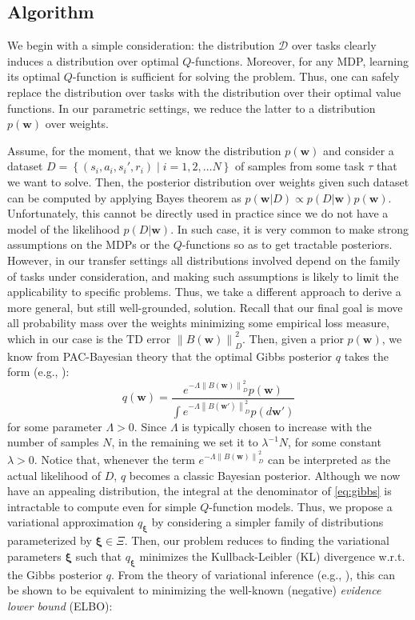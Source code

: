 \documentclass{article}
\newcommand{\norm}[1]{\left\lVert #1 \right\rVert}
\begin{document}
\subsection{Algorithm}\label{sec:alg}

We begin with a simple consideration: the distribution $\mathcal{D}$ over tasks clearly induces a distribution over optimal $Q$-functions.  Moreover, for any MDP, learning its optimal $Q$-function is sufficient for solving the problem. Thus, one can safely replace the distribution over tasks with the distribution over their optimal value functions. In our parametric settings, we reduce the latter to a distribution $p(\bm{w})$ over weights.
 
Assume, for the moment, that we know the distribution $p(\bm{w})$ and consider a dataset $D=\left\{(s_i,a_i,s_i',r_i) \mid i = 1,2,\dots N\right\}$ of samples from some task $\tau$ that we want to solve. Then, the posterior distribution over weights given such dataset can be computed by applying Bayes theorem as $p(\bm{w} | D) \propto p(D | \bm{w})p(\bm{w})$. Unfortunately, this cannot be directly used in practice since we do not have a model of the likelihood $p(D|\bm{w})$. In such case, it is very common to make strong assumptions on the MDPs or the $Q$-functions so as to get tractable posteriors. However, in our transfer settings all distributions involved depend on the family of tasks under consideration, and making such assumptions is likely to limit the applicability to specific problems. Thus, we take a different approach to derive a more general, but still well-grounded, solution. Recall that our final goal is move all probability mass over the weights minimizing some empirical loss measure, which in our case is the TD error $\norm{B(\bm{w})}_D^2$. Then, given a prior $p(\bm{w})$, we know from PAC-Bayesian theory that the optimal Gibbs posterior $q$ takes the form (e.g., \cite{catoni2007pac}):
\begin{equation}\label{eq:gibbs}
q(\bm{w}) = \frac{e^{-\Lambda\norm{B(\bm{w})}_D^2}p(\bm{w})}{\int e^{-\Lambda\norm{B(\bm{w}')}_D^2}p(d\bm{w}')}
\end{equation}
for some parameter $\Lambda > 0$.  Since $\Lambda$ is typically chosen to increase with the number of samples $N$, in the remaining we set it to $\lambda^{-1}N$, for some constant $\lambda > 0$. Notice that, whenever the term $e^{-\Lambda\norm{B(\bm{w})}_D^2}$ can be interpreted as the actual likelihood of $D$, $q$ becomes a classic Bayesian posterior. Although we now have an appealing distribution, the integral at the denominator of \eqref{eq:gibbs} is intractable to compute even for simple $Q$-function models. Thus, we propose a variational approximation $q_{\bm{\xi}}$ by considering a simpler family of distributions parameterized by $\bm{\xi} \in \Xi$. Then, our problem reduces to finding the variational parameters $\bm{\xi}$ such that $q_{\bm{\xi}}$ minimizes the Kullback-Leibler (KL) divergence w.r.t. the Gibbs posterior $q$. From the theory of variational inference (e.g., \cite{blei2017variational}), this can be shown to be equivalent to minimizing the well-known (negative) \textit{evidence lower bound} (ELBO):
\end{document}
